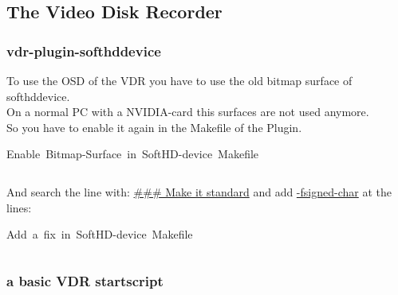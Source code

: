 \documentclass[11pt, a4paper,ngerman]{article}
\begin{document}
\subsection{The Video Disk Recorder}

\subsubsection{vdr-plugin-softhddevice}

To use the OSD of the VDR you have to use the old bitmap surface of softhddevice. \\
On a normal PC with a NVIDIA-card this surfaces are not used anymore. \\

So you have to enable it again in the Makefile of the Plugin. \\

\begin{mintedbox}[breakable=true,
 bottomrule=0.5mm,
 width=\paperwidth-3cm,
 boxsep=1mm, 
 enhanced=true,
 colframe = monoblack,
 drop fuzzy shadow,
 colback = black
 ]{Enable\ Bitmap-Surface\ in\ SoftHD-device\ Makefile}%
 

     \inputminted[firstline=32,lastline=32, 
     linenos=true, framesep=2mm, mathescape, numbersep=5pt,tabsize=4,%
]{bash}{includes/software.sh}%

\end{mintedbox}%
\vspace{0.2cm}

And search the line with: \underline{\#\#\# Make it standard} and add \underline{-fsigned-char} at the lines: \\

\begin{mintedbox}[breakable=true,
 bottomrule=0.5mm,
 width=\paperwidth-3cm,
 boxsep=1mm, 
 enhanced=true,
 colframe = monoblack,
 drop fuzzy shadow,
 colback = black
 ]{Add\ a\ fix\ in\ SoftHD-device\ Makefile}%
 

     \inputminted[firstline=34,lastline=37, 
     linenos=true, framesep=2mm, mathescape, numbersep=5pt,tabsize=4,%
]{bash}{includes/software.sh}%

\end{mintedbox}%
\vspace{0.2cm}

\subsubsection{a basic VDR startscript}
\end{document}
